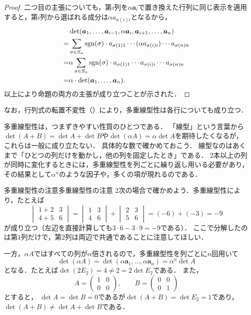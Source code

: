 \begin{tleftbar}
\begin{proof}
  二つ目の主張についても，第$i$列を$\alpha\bm{a}_i$で置き換えた行列に同じ表示を適用すると，第$i$列から選ばれる成分は$\alpha a_{\sigma(i)i}$となるから，
  \begin{align*} 
    &\det(\bm{a}_1, \dots, \bm{a}_{i-1}, \alpha \bm{a}_i, \bm{a}_{i+1}, \dots, \bm{a}_n) \\
    =& \sum_{\sigma \in S_n} \sgn(\sigma) \cdot a_{\sigma(1)1} \dotsm (\alpha a_{\sigma(i)i}) \dotsm a_{\sigma(n)n} \\
    =& \alpha \sum_{\sigma \in S_n} \sgn(\sigma) \cdot a_{\sigma(1)1} \dotsm a_{\sigma(i)i} \dotsm a_{\sigma(n)n} \\
    =& \alpha \cdot \det(\bm{a}_1, \dots, \bm{a}_n).
  \end{align*}
  以上により命題の両方の主張が成り立つことが示された．
\end{proof}
\end{tleftbar}

なお，行列式の転置不変性（）により，多重線型性は各行についても成り立つ．

多重線型性は，つまずきやすい性質のひとつである．
「線型」という言葉から$\det(A + B) = \det A + \det B$や$\det(\alpha A) = \alpha \det A$を期待したくなるが，これらは一般に成り立たない．
具体的な数で確かめておこう．
線型なのはあくまで「ひとつの列だけを動かし，他の列を固定したとき」である．
$2$本以上の列が同時に変化するときには，多重線型性を列ごとに繰り返し用いる必要があり，その結果として$\alpha^n$のような因子や，多くの項が現れるのである．

\begin{example}{多重線型性の注意}{多重線型性の注意}
  $2$次の場合で確かめよう．多重線型性により，たとえば
  \[
    \begin{vmatrix} 1 + 2 & 3 \\ 4 + 5 & 6 \end{vmatrix}
    = \begin{vmatrix} 1 & 3 \\ 4 & 6 \end{vmatrix} + \begin{vmatrix} 2 & 3 \\ 5 & 6 \end{vmatrix}
    = (-6) + (-3) = -9
  \]
  が成り立つ（左辺を直接計算しても$3 \cdot 6 - 3 \cdot 9 = -9$である）．
  ここで分解したのは第$1$列だけで，第$2$列は両辺で共通であることに注意してほしい．

  一方，$\alpha A$ではすべての列が$\alpha$倍されるので，多重線型性を列ごとに$n$回用いて
  \[
    \det(\alpha A) = \det(\alpha\bm{a}_1, \dots, \alpha\bm{a}_n) = \alpha^n \det A
  \]
  となる．たとえば$\det(2E_2) = 4 \ne 2 = 2\det E_2$である．
  また，
  \[
    A = \begin{pmatrix} 1 & 0 \\ 0 & 0 \end{pmatrix}, \qquad
    B = \begin{pmatrix} 0 & 0 \\ 0 & 1 \end{pmatrix}
  \]
  とすると，
  $\det A = \det B = 0$であるが$\det(A + B) = \det E_2 = 1$であり，$\det(A + B) \ne \det A + \det B$である．
\end{example}

